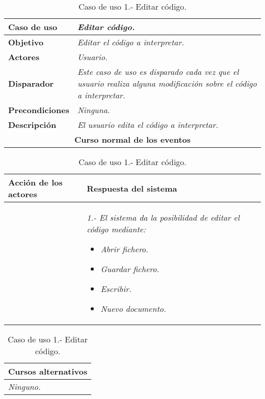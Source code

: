 \documentclass[twoside,a4paper,11pt]{book}
\begin{document}
\begin{table}[!ht]
    \centering
    \begin{tabular}{|p{4cm}|p{11.5cm}|}
    \hline

    \textbf{Caso de uso} & \textit{Editar código.}\\
    \hline

    \textbf{Objetivo} & \textit{Editar el código a interpretar.}\\
    \hline

    \textbf{Actores} & \textit{Usuario.}\\
    \hline

    \textbf{Disparador} & \textit{Este caso de uso es disparado cada vez que el usuario realiza alguna modificación sobre el código a interpretar.}\\
    \hline

    \textbf{Precondiciones} & \textit{Ninguna.}\\
    \hline

    \textbf{Descripción} & \textit{El usuario edita el código a interpretar.}\\
    \hline

    \multicolumn{2}{|c|}{\textbf{Curso normal de los eventos}}\\
    \hline

    \end{tabular}
    \begin{tabular}{|p{7.75cm}|p{7.75cm}|}
    \hspace{2cm}\textbf{Acción de los actores} & \hspace{1.75cm}\textbf{Respuesta del sistema}\\
    \hline

    & 
    \textit{1.- El sistema da la posibilidad de editar el código mediante:}
   
      \begin{itemize}
	\item \textit{Abrir fichero.}
	\item \textit{Guardar fichero.}
	\item \textit{Escribir.}
	\item \textit{Nuevo documento.}
      \end{itemize}
    \\
    \hline

    \end{tabular}

    \begin{tabular}{|p{15.9cm}|}
      \hspace{6cm}\textbf{Cursos alternativos}\\
      \hline

    \textit{Ninguno.}\\
    \hline

    \end{tabular}
    \caption{Caso de uso 1.- Editar código.}
\end{table}
\end{document}
